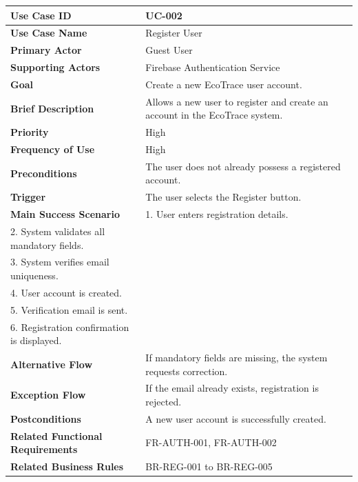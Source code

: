 \begin{longtable}{|p{4cm}|p{10cm}|}

\hline
\textbf{Use Case ID} &
UC-002 \\
\hline

\textbf{Use Case Name} &
Register User \\
\hline

\textbf{Primary Actor} &
Guest User \\
\hline

\textbf{Supporting Actors} &
Firebase Authentication Service \\
\hline

\textbf{Goal} &
Create a new EcoTrace user account. \\
\hline

\textbf{Brief Description} &
Allows a new user to register and create an account in the EcoTrace
system. \\
\hline

\textbf{Priority} &
High \\
\hline

\textbf{Frequency of Use} &
High \\
\hline

\textbf{Preconditions} &
The user does not already possess a registered account. \\
\hline

\textbf{Trigger} &
The user selects the Register button. \\
\hline

\textbf{Main Success Scenario} &
1. User enters registration details.\\
2. System validates all mandatory fields.\\
3. System verifies email uniqueness.\\
4. User account is created.\\
5. Verification email is sent.\\
6. Registration confirmation is displayed.\\
\hline

\textbf{Alternative Flow} &
If mandatory fields are missing, the system requests correction. \\
\hline

\textbf{Exception Flow} &
If the email already exists, registration is rejected. \\
\hline

\textbf{Postconditions} &
A new user account is successfully created. \\
\hline

\textbf{Related Functional Requirements} &
FR-AUTH-001, FR-AUTH-002 \\
\hline

\textbf{Related Business Rules} &
BR-REG-001 to BR-REG-005 \\
\hline

\end{longtable}

